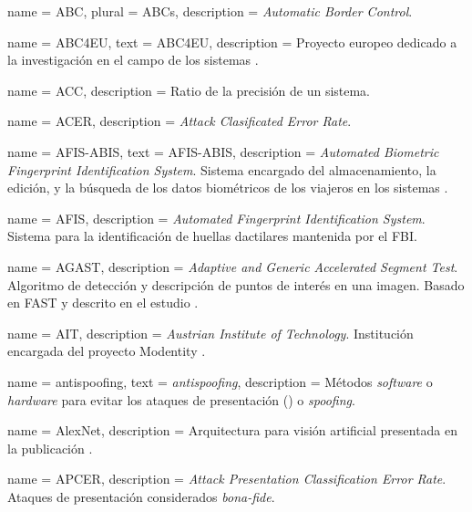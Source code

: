 {
    name        = {ABC},
    plural      = {ABCs},
    description = {\textit{Automatic Border Control}.}
}

{
    name        = {ABC4EU},
    text        = \mbox{ABC4EU},
    description = {Proyecto europeo  dedicado a la investigación en el campo de los sistemas  \cite{ABC4EUOnline}.}
}

{
    name        = {ACC},
    description = {Ratio de la precisión de un sistema.}
}

{
    name        = {ACER},
    description = {\textit{Attack Clasificated Error Rate}.}
}

{
    name        = {AFIS-ABIS},
    text        = {\mbox{AFIS-ABIS}},
    description = {\textit{Automated Biometric Fingerprint Identification System}. Sistema encargado del almacenamiento, la edición, y la búsqueda de los datos biométricos de los viajeros en los sistemas .}
}

{
    name        = {AFIS},
    description = {\textit{Automated Fingerprint Identification System}. Sistema para la identificación de huellas dactilares mantenida por el FBI.}
}

{
    name        = {AGAST},
    description = {\textit{Adaptive and Generic Accelerated Segment Test}. Algoritmo de detección y descripción de puntos de interés en una imagen. Basado en FAST y descrito en el estudio \cite{mair2010_agast}.}
}

{
    name        = {AIT},
    description = {\textit{Austrian Institute of Technology}. Institución encargada del proyecto Modentity \cite{ModentityOnline}.}
}

{
    name        = {antispoofing},
    text        = {\textit{antispoofing}},
    description = {Métodos \textit{software} o \textit{hardware} para evitar los ataques de presentación () o \textit{\gls{spoofing}}.}
}

{
    name        = {AlexNet},
    description = {Arquitectura  para visión artificial presentada en la publicación \cite{krizhevsky2012imagenet}.}
}

{
    name        = {APCER},
    description = {\textit{Attack Presentation Classification Error Rate}. Ataques de presentación considerados \textit{bona-fide}.}
}


